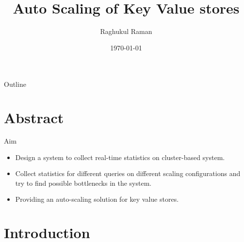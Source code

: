 \documentclass{beamer}
\title[CS396]{Auto Scaling of Key Value stores}
\author{Raghukul Raman}
\institute{IIT Kanpur}
\date{\today}
\begin{document}
\begin{frame}
  \titlepage
\end{frame}

\begin{frame}{Outline}
  \tableofcontents
\end{frame}

\section{Abstract}

\begin{frame}{Aim}
    \begin{itemize}
        \item Design a system to collect real-time statistics on cluster-based system.
        \item Collect statistics for different queries on different scaling configurations
            and try to find possible bottlenecks in the system.
        \item Providing an auto-scaling solution for key
                value stores. 
    \end{itemize}
\end{frame}

\section{Introduction}
\end{document}
